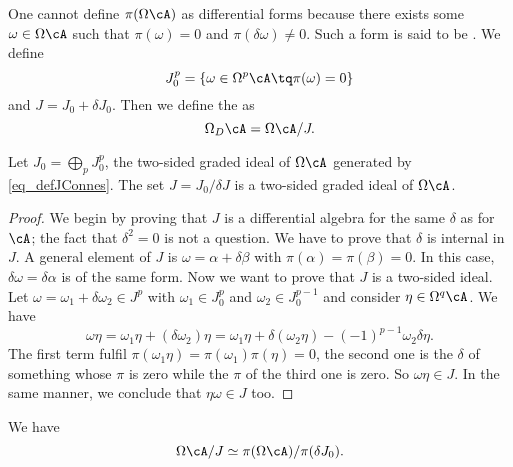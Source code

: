 One cannot define $\pi(\Omega\cA)$ as differential forms because there exists some $\omega\in\Omega\cA$ such that $\pi(\omega)=0$ and $\pi(\delta\omega)\neq 0$. Such a form is said to be . We define
\begin{equation}  \label{eq_defJConnes}
  J_0^p=\{ \omega\in\Omega^p\cA\tq \pi(\omega)=0 \}
\end{equation}
 and $J=J_0+\delta J_0$. Then we define the  as
\begin{equation}
\Omega_D\cA=\Omega\cA/J.
\end{equation}

\begin{proposition}
Let $J_0=\bigoplus_pJ_0^p$, the two-sided graded ideal of $\Omega\cA$ generated by \eqref{eq_defJConnes}.  The set $J=J_0/\delta J$ is a two-sided graded ideal of $\Omega\cA$.
\end{proposition}

\begin{proof}
We begin by proving that $J$ is a differential algebra for the same $\delta$ as for $\cA$; the fact that $\delta^2=0$ is not a question. We have to prove that $\delta$ is internal in $J$. A general element of $J$ is $\omega=\alpha+\delta\beta$ with $\pi(\alpha)=\pi(\beta)=0$. In this case, $\delta\omega=\delta\alpha$ is of the same form. Now we want to prove that $J$ is a two-sided ideal. Let $\omega=\omega_1+\delta\omega_2\in J^p$ with $\omega_1\in J_0^p$ and $\omega_2\in J_0^{p-1}$ and consider $\eta\in\Omega^q\cA$. We have
\[
  \omega\eta=\omega_1\eta+(\delta\omega_2)\eta
		=\omega_1\eta+\delta(\omega_2\eta)-(-1)^{p-1}\omega_2\delta\eta.
\]
The first term fulfil $\pi(\omega_1\eta)=\pi(\omega_1)\pi(\eta)=0$, the second one is the $\delta$ of something whose $\pi$ is zero  while the $\pi$ of the third one is zero. So $\omega\eta\in J$. In the same manner, we conclude that $\eta\omega\in J$ too.
\end{proof}

\begin{lemma}
We have
\begin{equation}
  \Omega\cA/J\simeq \pi(\Omega\cA)/\pi(\delta J_0).
\end{equation}
\label{lem_OCAisomppiOA}
\end{lemma}

